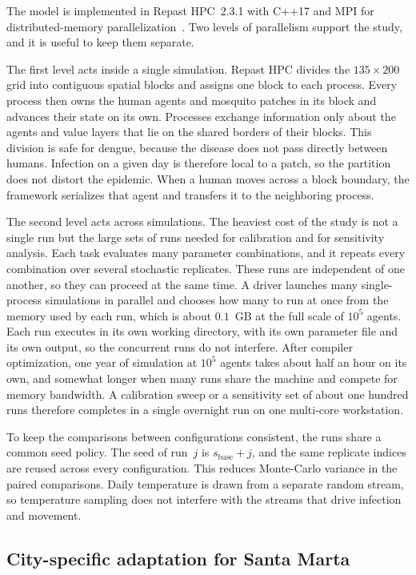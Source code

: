\documentclass[applsci,article,accept,pdftex,moreauthors]{Definitions/mdpi}
\begin{document}
The model is implemented in Repast HPC~2.3.1 with C++17 and MPI for distributed-memory parallelization~\cite{antelmi2022experimenting}. Two levels of parallelism support the study, and it is useful to keep them separate.

The first level acts inside a single simulation. Repast HPC divides the $135\times200$ grid into contiguous spatial blocks and assigns one block to each process. Every process then owns the human agents and mosquito patches in its block and advances their state on its own. Processes exchange information only about the agents and value layers that lie on the shared borders of their blocks. This division is safe for dengue, because the disease does not pass directly between humans. Infection on a given day is therefore local to a patch, so the partition does not distort the epidemic. When a human moves across a block boundary, the framework serializes that agent and transfers it to the neighboring process.

The second level acts across simulations. The heaviest cost of the study is not a single run but the large sets of runs needed for calibration and for sensitivity analysis. Each task evaluates many parameter combinations, and it repeats every combination over several stochastic replicates. These runs are independent of one another, so they can proceed at the same time. A driver launches many single-process simulations in parallel and chooses how many to run at once from the memory used by each run, which is about $0.1$~GB at the full scale of $10^5$ agents. Each run executes in its own working directory, with its own parameter file and its own output, so the concurrent runs do not interfere. After compiler optimization, one year of simulation at $10^5$ agents takes about half an hour on its own, and somewhat longer when many runs share the machine and compete for memory bandwidth. A calibration sweep or a sensitivity set of about one hundred runs therefore completes in a single overnight run on one multi-core workstation.

To keep the comparisons between configurations consistent, the runs share a common seed policy. The seed of run~$j$ is $s_{\text{base}}+j$, and the same replicate indices are reused across every configuration. This reduces Monte-Carlo variance in the paired comparisons. Daily temperature is drawn from a separate random stream, so temperature sampling does not interfere with the streams that drive infection and movement.

\subsection{City-specific adaptation for Santa Marta}
\label{sec:santamarta}
\end{document}
